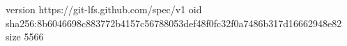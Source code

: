 version https://git-lfs.github.com/spec/v1
oid sha256:8b6046698c883772b4157c56788053def48f0fc32f0a7486b317d16662948e82
size 5566
